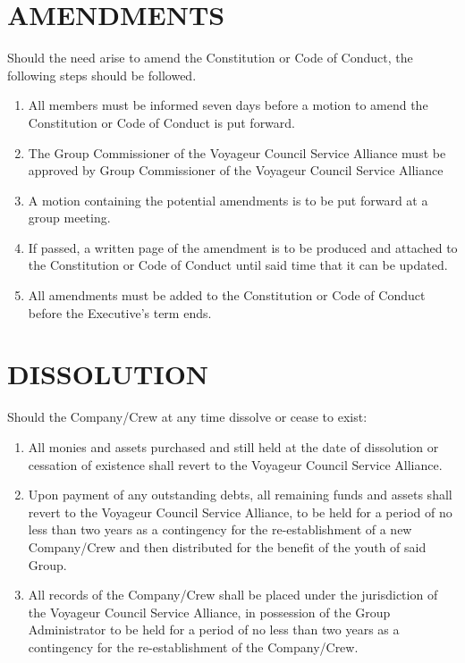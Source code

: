 \documentclass{Service_Corps_Document}
\begin{document}
    \section{AMENDMENTS}\label{sec:amendments}
    Should the need arise to amend the Constitution or Code of Conduct, the following steps should be followed.
    \begin{enumerate}
        \item All members must be informed seven days before a motion to amend the Constitution or Code of Conduct is put forward.
        \item The Group Commissioner of the Voyageur Council Service Alliance must be approved by Group Commissioner of the Voyageur Council Service Alliance
        \item A motion containing the potential amendments is to be put forward at a group meeting.
        \item If passed, a written page of the amendment is to be produced and attached to the Constitution or Code of Conduct until said time that it can be updated.
        \item All amendments must be added to the Constitution or Code of Conduct before the Executive's term ends.
    \end{enumerate}


    \section{DISSOLUTION}\label{sec:dissolution}
    Should the Company/Crew at any time dissolve or cease to exist:
    \begin{enumerate}
        \item All monies and assets purchased and still held at the date of dissolution or cessation of existence shall revert to the Voyageur Council Service Alliance.
        \item Upon payment of any outstanding debts, all remaining funds and assets shall revert to the Voyageur Council Service Alliance, to be held for a period of no less than two years as a contingency for the re-establishment of a new Company/Crew and then distributed for the benefit of the youth of said Group.
        \item All records of the Company/Crew shall be placed under the jurisdiction of the Voyageur Council Service Alliance, in possession of the Group Administrator to be held for a period of no less than two years as a contingency for the re-establishment of the Company/Crew.
    \end{enumerate}
\end{document}

